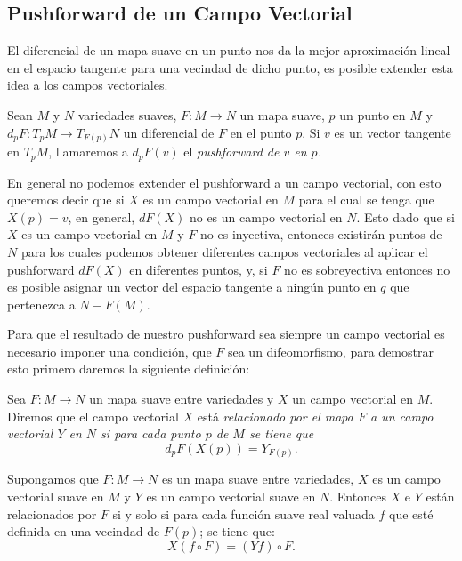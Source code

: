 \subsection{Pushforward de un Campo Vectorial}\label{Subsección: Pushforward de Campos Vectoriales}
El diferencial de un mapa suave en un punto nos da la mejor aproximación lineal en el espacio tangente para una vecindad de dicho punto, es posible extender esta idea a los campos vectoriales.

\begin{definition}[Pushforward]
  Sean $M$ y $N$ variedades suaves, $F: M \to N$ un mapa suave, $p$ un punto en $M$ y $d_pF: T_{p}M \to T_{F(p)}N$ un diferencial de $F$ en el punto $p$. Si $v$ es un vector tangente en $T_p M$, llamaremos a $d_pF(v)$ el \it{pushforward de $v$ en $p$}.
\end{definition}

En general no podemos extender el pushforward a un campo vectorial, con esto queremos decir que si $X$ es un campo vectorial en $M$ para el cual se tenga que $X(p) = v$, en general, $dF(X)$ no es un campo vectorial en $N$. Esto dado que si $X$ es un campo vectorial en $M$ y $F$ no es inyectiva, entonces existirán puntos de $N$ para los cuales podemos obtener diferentes campos vectoriales al aplicar el pushforward $dF(X)$ en diferentes puntos, y, si $F$ no es sobreyectiva entonces no es posible asignar un vector del espacio tangente a ningún punto en $q$ que pertenezca a $N - F(M)$.

Para que el resultado de nuestro pushforward sea siempre un campo vectorial es necesario imponer una condición, que $F$ sea un difeomorfismo, para demostrar esto primero daremos la siguiente definición:

\begin{definition}
	Sea $F: M \to N$ un mapa suave entre variedades y $X$ un campo vectorial en $M$. Diremos que el campo vectorial $X$ está \it{relacionado por el mapa $F$} a un campo vectorial $Y$ en $N$ si para cada punto $p$ de $M$ se tiene que
	\[
		d_pF(X(p)) = Y_{F(p)}.
	\]
\end{definition}

\begin{lemma}
	Supongamos que $F: M \to N$ es un mapa suave entre variedades, $X$ es un campo vectorial suave en $M$ y $Y$ es un campo vectorial suave en $N$. Entonces $X$ e $Y$ están relacionados por $F$ si y solo si para cada función suave real valuada $f$ que esté definida en una vecindad de $F(p)$; se tiene que:
	\[
		X(f \circ F) = (Yf) \circ F.
	\]
\end{lemma}

